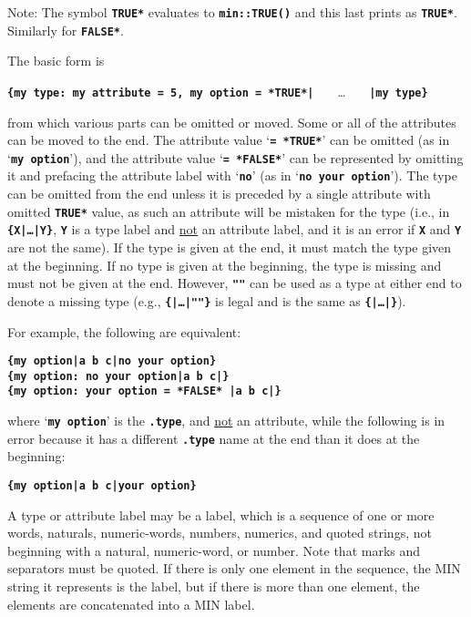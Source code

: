 \documentclass[12pt]{article}
\newcommand{\TT}[1]{{\tt \bfseries #1}}
\begin{document}
Note: The symbol \TT{*TRUE*} evaluates to \TT{min::TRUE()} and this last
prints as \TT{*TRUE*}.  Similarly for \TT{*FALSE*}.

The basic form is
\begin{center}
\TT{\{my type: my attribute = 5, my option = *TRUE*|} ~~~\ldots~~~
    \TT{|my type\}} \\
\end{center}
from which various parts can be omitted or moved.  Some or all of the
attributes can be moved to the end.
The attribute value `\TT{= *TRUE*}' can be omitted (as in
`\TT{my option}'), and the attribute value `\TT{= *FALSE*}' can be represented
by omitting it and prefacing the attribute label with `\TT{no}'
(as in `\TT{no your option}').
The type can be omitted from the end unless it is preceded
by a single attribute with omitted \TT{*TRUE*} value, as such an attribute
will be mistaken for the type
(i.e., in \TT{\{X|\ldots|Y\}}, \TT{Y} is
a type label and \underline{not} an attribute label, and it is an error
if \TT{X} and \TT{Y} are not the same).
If the type is given at the end, it must match the type given at the
beginning.  If no type is given at the beginning, the type is missing
and must not be given at the end.  However, \TT{""} can be used as a type
at either end to denote a missing type (e.g., \TT{\{|\ldots|""\}} is
legal and is the same as \TT{\{|\ldots|\}}).

For example, the following are equivalent:
\begin{center}
\TT{\{my option|a b c|no your option\}} \\
\TT{\{my option:~no your option|a b c|\}} \\
\TT{\{my option:~your option = *FALSE* |a b c|\}}
\end{center}

where `\TT{my option}' is the \TT{.type}, and \underline{not}
an attribute,
while the following is in error because it has a different \TT{.type} name
at the end than it does at the beginning:
\begin{center}
\TT{\{my option|a b c|your option\}} \\
\end{center}

A type or attribute label may be a label,
which is a sequence
of one or more words, naturals, numeric-words, numbers,
numerics, and quoted strings,
not beginning with a natural, numeric-word, or number.
Note that marks and separators must be quoted.
If there is only
one element in the sequence, the MIN string it represents is the
label, but if there is more than one element, the elements
are concatenated into a MIN label.
\end{document}
